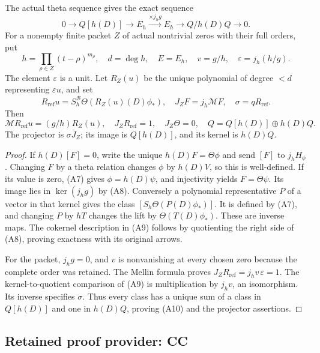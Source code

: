 \documentclass[11pt,a4paper]{article}
\begin{document}
\begin{theorem}
The actual theta sequence gives the exact sequence
\[
 0\longrightarrow Q[h(D)]\longrightarrow E_h
       \xrightarrow{\times j_hg}E_h
       \longrightarrow Q/h(D)Q\longrightarrow0 .
 \tag{A9}
\]
For a nonempty finite packet \(Z\) of actual nontrivial zeros
with their full orders,
put
\[
 h=\prod_{\rho\in Z}(t-\rho)^{m_\rho},\quad d=\deg h,\quad
 E=E_h,\quad v=g/h,\quad \varepsilon=j_h(h/g).
\]
The element \(\varepsilon\) is a unit. Let \(R_Z(u)\) be the unique
polynomial of degree \(<d\) representing \(\varepsilon u\), and set
\[
 R_{\mathrm{ref}}u=S_h^{\mathscr B}\Theta(R_Z(u)(D)\phi_*),\quad
 J_ZF=j_h\mathcal MF,\quad \sigma=qR_{\mathrm{ref}} .
\]
Then
\[
 \mathcal M R_{\mathrm{ref}}u=(g/h)R_Z(u),\quad J_ZR_{\mathrm{ref}}=1,\quad J_Z\Theta=0,
 \quad Q=Q[h(D)]\oplus h(D)Q .
 \tag{A10}
\]
The projector is \(\sigma\overline J_Z\); its image is \(Q[h(D)]\),
and its kernel is \(h(D)Q\).
\end{theorem}
\begin{proof}
If \(h(D)[F]=0\), write the unique
\(h(D)F=\Theta\phi\) and send \([F]\) to \(j_hH_\phi\).
Changing \(F\) by a theta relation changes \(\phi\) by \(h(D)V\),
so this is well-defined. If its value is zero, (A7) gives
\(\phi=h(D)\psi\), and injectivity yields \(F=\Theta\psi\).
Its image lies in \(\ker(j_hg)\) by (A8).
Conversely a polynomial representative \(P\) of a vector in that
kernel gives the class \([S_h\Theta(P(D)\phi_*)]\).
It is defined by (A7), and changing \(P\) by \(hT\) changes the lift
by \(\Theta(T(D)\phi_*)\). These are inverse maps.
The cokernel description in (A9) follows by quotienting the
right side of (A8), proving exactness with its original arrows.

For the packet, \(j_hg=0\), and \(v\) is nonvanishing at every
chosen zero because the complete order was retained. The Mellin
formula proves \(J_ZR_{\mathrm{ref}}=j_hv\,\varepsilon=1\).
The kernel-to-quotient comparison of (A9) is multiplication by
\(j_hv\), an isomorphism. Its inverse specifies \(\sigma\).
Thus every class has a unique sum of a class in \(Q[h(D)]\)
and one in \(h(D)Q\), proving (A10) and the projector assertions.
\end{proof}


\clearpage
\subsection*{Retained proof provider: CC}
\end{document}
